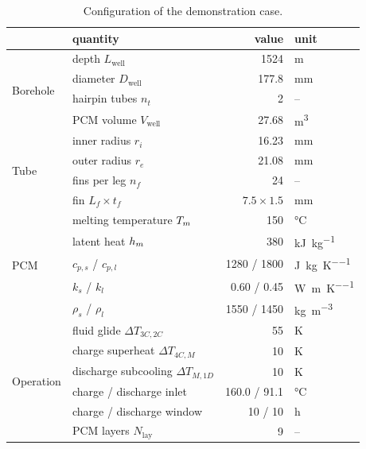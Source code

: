 \begin{table}[htbp]
\centering
\caption{Configuration of the demonstration case.}
\label{tab:config}
\begin{tabular}{@{}l l r l@{}}
\toprule
 & quantity & value & unit \\
\midrule
\multirow{4}{*}{Borehole}
 & depth $L_{\mathrm{well}}$ & 1524 & \si{\meter} \\
 & diameter $D_{\mathrm{well}}$ & 177.8 & \si{\milli\meter} \\
 & hairpin tubes $n_{t}$ & 2 & -- \\
 & PCM volume $V_{\mathrm{well}}$ & 27.68 & \si{\meter\cubed} \\
\midrule
\multirow{4}{*}{Tube}
 & inner radius $r_{i}$ & 16.23 & \si{\milli\meter} \\
 & outer radius $r_{e}$ & 21.08 & \si{\milli\meter} \\
 & fins per leg $n_{f}$ & 24 & -- \\
 & fin $L_{f}\times t_{f}$ & $7.5\times1.5$ & \si{\milli\meter} \\
\midrule
\multirow{5}{*}{PCM}
 & melting temperature $T_{m}$ & 150 & \si{\celsius} \\
 & latent heat $h_{m}$ & 380 & \si{\kilo\joule\per\kilogram} \\
 & $c_{p,s}$ / $c_{p,l}$ & 1280 / 1800 & \si{\joule\per\kilogram\per\kelvin} \\
 & $k_{s}$ / $k_{l}$ & 0.60 / 0.45 & \si{\watt\per\meter\per\kelvin} \\
 & $\rho_{s}$ / $\rho_{l}$ & 1550 / 1450 & \si{\kilogram\per\meter\cubed} \\
\midrule
\multirow{6}{*}{Operation}
 & fluid glide $\Delta T_{3C,2C}$ & 55 & \si{\kelvin} \\
 & charge superheat $\Delta T_{4C,M}$ & 10 & \si{\kelvin} \\
 & discharge subcooling $\Delta T_{M,1D}$ & 10 & \si{\kelvin} \\
 & charge / discharge inlet & 160.0 / 91.1 & \si{\celsius} \\
 & charge / discharge window & 10 / 10 & \si{\hour} \\
 & PCM layers $N_{\mathrm{lay}}$ & 9 & -- \\
\bottomrule
\end{tabular}
\end{table}

